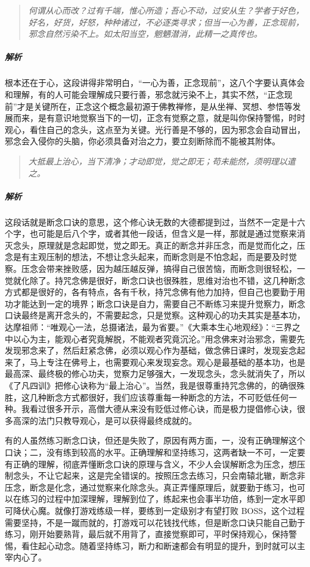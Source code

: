 \begin{quote}\it
    何谓从心而改？过有千端，惟心所造；吾心不动，过安从生？学者于好色，好名，好货，好怒，种种诸过，不必逐类寻求；但当一心为善，正念现前，邪念自然污染不上。如太阳当空，魍魉潜消，此精一之真传也。
\end{quote}

\subparagraph{解析} 根本还在于心，这段讲得非常明白，“一心为善，正念现前”，这八个字要认真体会和理解，有的人可能会理解成只要行善，邪念就污染不上，其实不然，“正念现前”才是关键所在，正念这个概念最初源于佛教禅修，是从坐禅、冥想、参悟等发展而来，是有意识地觉察当下的一切，正念有觉察之意，就是叫你保持警惕，时时观心，看住自己的念头，这点至为关键。光行善是不够的，因为邪念会自动冒出，邪念会入侵你的头脑，你必须具备对治之力，要立刻断除而不能被其附体。

\begin{quote}\it
    大抵最上治心，当下清净；才动即觉，觉之即无；苟未能然，须明理以遣之。
\end{quote}

\subparagraph{解析} 这段话就是断念口诀的意思，这个修心诀无数的大德都提到过，当然不一定是十六个字，也可能是后八个字，或者其他一段话，但含义是一样，那就是通过觉察来消灭念头，原理就是念起即觉，觉之即无。真正的断念并非压念，而是觉而化之，压念是有主观压制的想法，不想让念头起来，而断念则是不怕念起，而是要及时觉察。压念会带来挫败感，因为越压越反弹，搞得自己很苦恼，而断念则很轻松，一觉就化除了。持咒念佛是很好，断念口诀也很殊胜，思维对治也不错，这几种断念方式都是很好的，各有特点，各有千秋，持咒念佛有他力加持，但自己也要勤于用功才能达到一定的境界；断念口诀是自力，需要自己不断练习来提升觉察力，断念口诀最终是离开念头的，不需要起念，只是觉察。这种观心的功夫其实是基本功，达摩祖师：“唯观心一法，总摄诸法，最为省要。”《大乘本生心地观经》：“三界之中以心为主，能观心者究竟解脱，不能观者究竟沉沦。”用念佛来对治邪念，需要先发现邪念来了，然后赶紧念佛，必须以观心作为基础，做念佛日课时，发现妄念起来了，马上专注在佛号上，也需要观心来发现妄念。观心是最基础的基本功，也是最高深、最终极的修心功夫，觉察力足够强大，一发现念头，念头就消失了，所以《了凡四训》把修心诀称为“最上治心”。当然，我是很尊重持咒念佛的，的确很殊胜，这几种断念方式都很好，我们应该尊重每一种断念的方法，不可贬低任何一种。我看过很多开示，高僧大德从来没有贬低过修心诀，而是极力提倡修心诀，很多高深的法门只教导观心，是可以获得最终成就的。

有的人虽然练习断念口诀，但还是失败了，原因有两方面，一，没有正确理解这个口诀；二，没有练到较高的水平。正确理解和坚持练习，这两者缺一不可，一定要有正确的理解，彻底弄懂断念口诀的原理与含义，不少人会误解断念为压念，想压制念头，不让它起来，这是完全错误的。按照压念去练习，只会南辕北辙，断念非压念，断念是化念，通过觉察来化除念头。真正弄懂原理后，就要勤于练习，也可以在练习的过程中加深理解，理解到位了，练起来也会事半功倍，练到一定水平即可降伏心魔。就像打游戏练级一样，要练到一定级别才有望打败 BOSS，这个过程需要坚持，不是一蹴而就的，打游戏可以花钱找代练，但是断念口诀只能自己勤于练习，刚开始要熟背，最后就不用背了，直接觉察即可，平时保持观心，保持警惕，看住起心动念。随着坚持练习，断力和断速都会有明显的提升，到时就可以主宰内心了。

